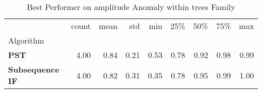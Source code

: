 \begin{table}
\caption{Best Performer on amplitude Anomaly within trees Family}
\label{tab:bp-amplitude_trees}
\begin{tabular}{lrrrrrrrr}
\toprule
 & count & mean & std & min & 25\% & 50\% & 75\% & max \\
Algorithm &  &  &  &  &  &  &  &  \\
\midrule
\textbf{PST} & 4.00 & 0.84 & 0.21 & 0.53 & 0.78 & 0.92 & 0.98 & 0.99 \\
\textbf{Subsequence IF} & 4.00 & 0.82 & 0.31 & 0.35 & 0.78 & 0.95 & 0.99 & 1.00 \\
\bottomrule
\end{tabular}
\end{table}
